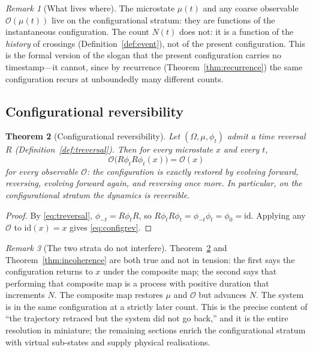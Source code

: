 \documentclass[11pt,a4paper]{article}
\theoremstyle{thmstyle}
\newtheorem{theorem}{Theorem}[section]
\theoremstyle{definition}
\theoremstyle{remark}
\newtheorem{remark}[theorem]{Remark}
\newcommand{\Mic}{\mu}
\newcommand{\Obs}{\mathcal{O}}
\newcommand{\Count}{N}
\newcommand{\Tinv}{R}
\newcommand{\flow}{\phi}
\begin{document}
\begin{remark}[What lives where]
\label{rem:whatlives}
The microstate $\Mic(t)$ and any coarse observable $\Obs(\Mic(t))$ live on
the configurational stratum: they are functions of the instantaneous
configuration. The count $\Count(t)$ does not: it is a function of the
\emph{history} of crossings (Definition~\ref{def:event}), not of the
present configuration. This is the formal version of the slogan that the
present configuration carries no timestamp---it cannot, since by recurrence
(Theorem~\ref{thm:recurrence}) the same configuration recurs at
unboundedly many different counts.
\end{remark}

\subsection{Configurational reversibility}
\label{sec:configreversible}

\begin{theorem}[Configurational reversibility]
\label{thm:configreversible}
Let $(\Omega,\mu,\flow_t)$ admit a time reversal $\Tinv$
(Definition~\ref{def:treversal}). Then for every microstate $x$ and every
$t$,
\begin{equation}
\Obs\bigl(\Tinv\flow_t\Tinv\flow_t(x)\bigr)=\Obs(x)
\label{eq:configrev}
\end{equation}
for every observable $\Obs$: the configuration is exactly restored by
evolving forward, reversing, evolving forward again, and reversing once
more. In particular, on the configurational stratum the dynamics is
reversible.
\end{theorem}

\begin{proof}
By \eqref{eq:treversal}, $\flow_{-t}=\Tinv\flow_t\Tinv$, so
$\Tinv\flow_t\Tinv\flow_t=\flow_{-t}\flow_t=\flow_0=\mathrm{id}$. Applying
any $\Obs$ to $\mathrm{id}(x)=x$ gives \eqref{eq:configrev}.
\end{proof}

\begin{remark}[The two strata do not interfere]
\label{rem:noninterference}
Theorem~\ref{thm:configreversible} and Theorem~\ref{thm:incoherence} are
both true and not in tension: the first says the configuration returns to
$x$ under the composite map; the second says that performing that
composite map is a process with positive duration that increments
$\Count$. The composite map restores $\Mic$ and $\Obs$ but advances
$\Count$. The system is in the same configuration at a strictly later
count. This is the precise content of ``the trajectory retraced but the
system did not go back,'' and it is the entire resolution in miniature; the
remaining sections enrich the configurational stratum with virtual
sub-states and supply physical realisations.
\end{remark}
\end{document}
